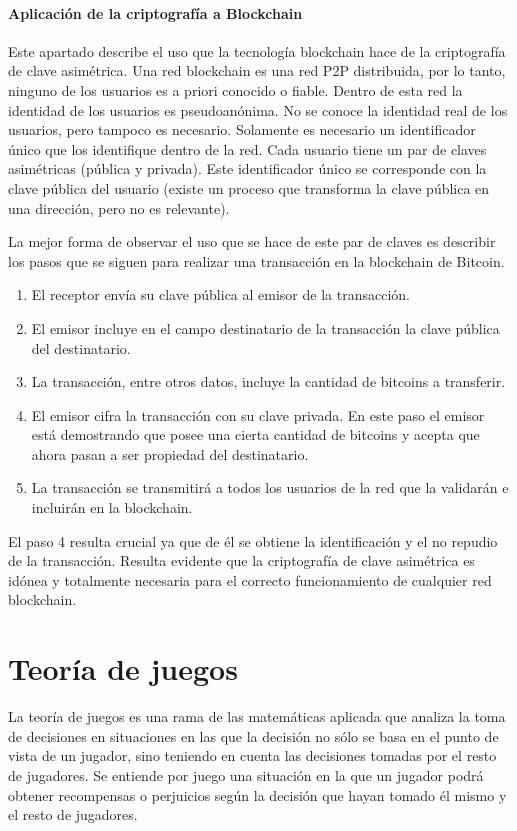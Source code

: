 \paragraph{Aplicación de la criptografía a Blockchain}

Este apartado describe el uso que la tecnología blockchain hace de la criptografía de clave asimétrica. Una red blockchain es una red P2P distribuida, por lo tanto, ninguno de los usuarios es a priori conocido o fiable. Dentro de esta red la identidad de los usuarios es pseudoanónima. No se conoce la identidad real de los usuarios, pero tampoco es necesario. Solamente es necesario un identificador único que los identifique dentro de la red. Cada usuario tiene un par de claves asimétricas (pública y privada). Este identificador único se corresponde con la clave pública del usuario (existe un proceso que transforma la clave pública en una dirección, pero no es relevante). \newline

La mejor forma de observar el uso que se hace de este par de claves es describir los pasos que se siguen para realizar una transacción en la blockchain de Bitcoin.

\begin{enumerate}
	\item El receptor envía su clave pública al emisor de la transacción.
	\item El emisor incluye en el campo destinatario de la transacción la clave pública del destinatario.
	\item La transacción, entre otros datos, incluye la cantidad de bitcoins a transferir.
	\item El emisor cifra la transacción con su clave privada. En este paso el emisor está demostrando que posee una cierta cantidad de bitcoins y acepta que ahora pasan a ser propiedad del destinatario.
	\item La transacción se transmitirá a todos los usuarios de la red que la validarán e incluirán en la blockchain.
\end{enumerate}

El paso 4 resulta crucial ya que de él se obtiene la identificación y el no repudio de la transacción. Resulta evidente que la criptografía de clave asimétrica es idónea y totalmente necesaria para el correcto funcionamiento de cualquier red blockchain.

\section{Teoría de juegos}
La teoría de juegos es una rama de las matemáticas aplicada que analiza la toma de decisiones en situaciones en las que la decisión no sólo se basa en el punto de vista de un jugador, sino teniendo en cuenta las decisiones tomadas por el resto de jugadores. Se entiende por juego una situación en la que un jugador podrá obtener recompensas o perjuicios según la decisión que hayan tomado él mismo y el resto de jugadores. \newline

